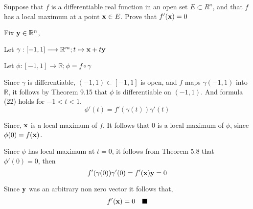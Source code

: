 \documentclass{article}
\newcommand\R{\mathbb{R}}
\begin{document}
Suppose that $f$ is a differentiable real function in an open set
$E\subset R^n$, and that $f$ has a local maximum at a point $\vb{x}\in
E$. Prove that $f'(\vb{x}) = 0$


Fix $\vb{y}\in \R^n$,

Let $\gamma: [-1,1]\longrightarrow \R^m; t\mapsto \vb{x} + t\vb{y}$

Let $\phi: [-1,1]\longrightarrow \R; \phi =  f \circ \gamma$

Since $\gamma$ is differentiable, $(-1,1)\subset [-1,1]$ is open, and $f$ maps
$\gamma(-1,1)$ into $\R$, it follows by Theorem
9.15 that $\phi$ is differentiable on $(-1,1)$. And formula (22) holds
 for $-1<t<1$,
\begin{equation}\phi'(t) = f'(\gamma(t))\gamma'(t)\end{equation}

Since, $\vb{x}$ is a local maximum of $f$. It follows that $0$
is a  local maximum of $\phi$, since $\phi(0) = f(\vb{x})$.

Since $\phi$ has  local maximum at $t=0$, it follows from Theorem 5.8
that $\phi'(0)= 0$, then
\begin{equation} f'(\gamma(0))\gamma'(0) = f'(\vb{x}) \vb{y} = 0\end{equation}

Since $\vb{y}$ was an arbitrary non zero vector it follows that,
\[ f'(\vb{x}) = 0\quad \blacksquare\]
\end{document}
